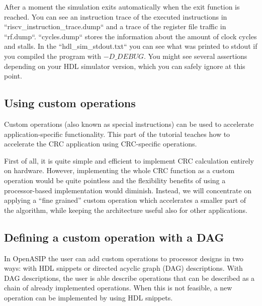 \documentclass[a4paper,twoside]{tceusermanual}
\begin{document}
After a moment the simulation exits automatically when the exit function is
reached. You can see an instruction trace of the executed instructions in
``riscv\_instruction\_trace.dump`` and a trace of the register file traffic in 
``rf.dump``. ``cycles.dump`` stores the information about the amount of clock cycles
and stalls. In the ``hdl\_sim\_stdout.txt`` you can see what was printed to stdout
if you compiled the program with $-D\_DEBUG$.
You might see several assertions depending on your HDL simulator
version, which you can safely ignore at this point.

\subsection{Using custom operations}

Custom operations (also known as special instructions) can be used to accelerate
application-specific functionality. This part of the tutorial teaches how to
accelerate the CRC application using CRC-specific operations.


First of all, it is quite simple and efficient to implement CRC
calculation entirely on hardware. However, implementing the whole CRC
function as a custom operation would be quite pointless and the
flexibility benefits of using a processor-based implementation would diminish.
Instead, we will concentrate on applying a ``fine grained'' custom
operation which accelerates a smaller part of the algorithm, while
keeping the architecture useful also for other applications.


\subsection{Defining a custom operation with a DAG}

In OpenASIP the user can add custom operations to processor designs in two ways:
with HDL snippets or directed acyclic graph (DAG) descriptions. With DAG descriptions,
the user is able describe operations that can be described as a chain of already
implemented operations. When this is not feasible, a new operation can be
implemented by using HDL snippets.
\end{document}
